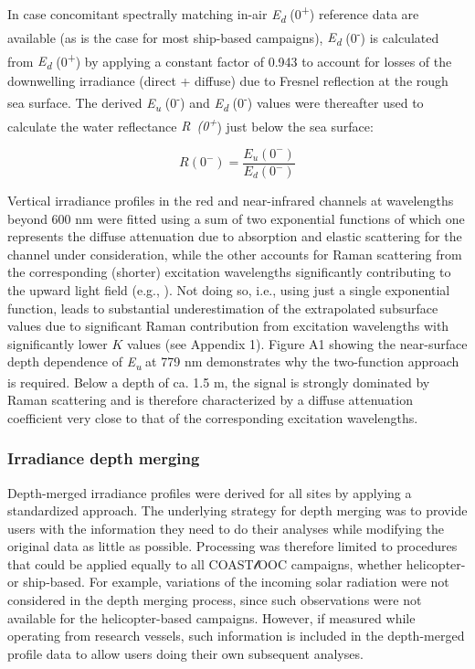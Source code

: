 \documentclass[essd, manuscript]{copernicus}
\begin{document}
In case concomitant spectrally matching in-air \textit{E\textsubscript{d}} (0\textsuperscript{+}) reference data are available (as is the case for most ship-based campaigns), \textit{E\textsubscript{d}} (0\textsuperscript{-}) is calculated from \textit{E\textsubscript{d}} (0\textsuperscript{+}) by applying a constant factor of 0.943 to account for losses of the downwelling irradiance (direct + diffuse) due to Fresnel reflection at the rough sea surface. The derived \textit{E\textsubscript{u}} (0\textsuperscript{-}) and \textit{E\textsubscript{d}} (0\textsuperscript{-}) values were thereafter used to calculate the water reflectance \textit{R~(0\textsuperscript{+}}) just below the sea surface:

\begin{equation}
    R(0^-) = \frac{E_u(0^-)}{E_d(0^-)}
\end{equation}

Vertical irradiance profiles in the red and near-infrared channels at wavelengths beyond 600 nm were fitted using a sum of two exponential functions of which one represents the diffuse attenuation due to absorption and elastic scattering for the channel under consideration, while the other accounts for Raman scattering from the corresponding (shorter) excitation wavelengths significantly contributing to the upward light field (e.g., \citealt{Sugihara1984}). Not doing so, i.e., using just a single exponential function, leads to substantial underestimation of the extrapolated subsurface values due to significant Raman contribution from excitation wavelengths with significantly lower $K$ values (see Appendix 1). Figure A1 showing the near-surface depth dependence of \textit{E\textsubscript{u}} at 779 nm demonstrates why the two-function approach is required. Below a depth of ca. 1.5 m, the signal is strongly dominated by Raman scattering and is therefore characterized by a diffuse attenuation coefficient very close to that of the corresponding excitation wavelengths.

\subsubsection{Irradiance depth merging}

Depth-merged irradiance profiles were derived for all sites by applying a standardized approach. The underlying strategy for depth merging was to provide users with the information they need to do their analyses while modifying the original data as little as possible. Processing was therefore limited to procedures that could be applied equally to all COAST$\mathscr{l}$OOC campaigns, whether helicopter- or ship-based. For example, variations of the incoming solar radiation were not considered in the depth merging process, since such observations were not available for the helicopter-based campaigns. However, if measured while operating from research vessels, such information is included in the depth-merged profile data to allow users doing their own subsequent analyses.
\end{document}
